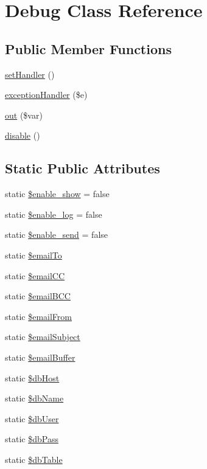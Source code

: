 \hypertarget{class_debug}{\section{Debug Class Reference}
\label{class_debug}
}
\subsection*{Public Member Functions}
\begin{DoxyCompactItemize}
\item 
\hyperlink{class_debug_a475b1cea5652fafc04c94e97ef82fe83}{set\-Handler} ()
\item 
\hyperlink{class_debug_af17dfe92627c634e9450cf38eaef881b}{exception\-Handler} (\$e)
\item 
\hyperlink{class_debug_ab018ff0e2ab4f2d17353586f25d955a8}{out} (\$var)
\item 
\hyperlink{class_debug_a545341e59cc9a0dafc4e265d60d4b5d6}{disable} ()
\end{DoxyCompactItemize}
\subsection*{Static Public Attributes}
\begin{DoxyCompactItemize}
\item 
static \hyperlink{class_debug_a5789d2d16b0d24dc6aa96b63b4f6f605}{\$enable\-\_\-show} = false
\item 
static \hyperlink{class_debug_abf6da1366fe6b13a73e55c0962433b5f}{\$enable\-\_\-log} = false
\item 
static \hyperlink{class_debug_aeb64a58109ab72544114d51e42a3ca4f}{\$enable\-\_\-send} = false
\item 
static \hyperlink{class_debug_a2dca3002fa879522effbe7bd729d681d}{\$email\-To}
\item 
static \hyperlink{class_debug_aef55490ba633a1821bc784c7c5e5a5e5}{\$email\-C\-C}
\item 
static \hyperlink{class_debug_ace2c8fd77a23d56cfdc35a142df1b1ab}{\$email\-B\-C\-C}
\item 
static \hyperlink{class_debug_a8812e953c70aa15f8f01e0a83230e645}{\$email\-From}
\item 
static \hyperlink{class_debug_afc4243e1cc62688011c169b622433f64}{\$email\-Subject}
\item 
static \hyperlink{class_debug_a6da5505f5274a47a70fb0cbac5eef25e}{\$email\-Buffer}
\item 
static \hyperlink{class_debug_ad0ddb2725e69c88a729e0cc242a1b2a6}{\$db\-Host}
\item 
static \hyperlink{class_debug_a68f39949e76b64662a06cb56579d91c3}{\$db\-Name}
\item 
static \hyperlink{class_debug_a4a92606de85aafdc0dcae4976b7ca669}{\$db\-User}
\item 
static \hyperlink{class_debug_a30d808caf55f524798c6a5aaafd633ad}{\$db\-Pass}
\item 
static \hyperlink{class_debug_adfd23e5286c56c7632ecb55887dd2555}{\$db\-Table}
\end{DoxyCompactItemize}


